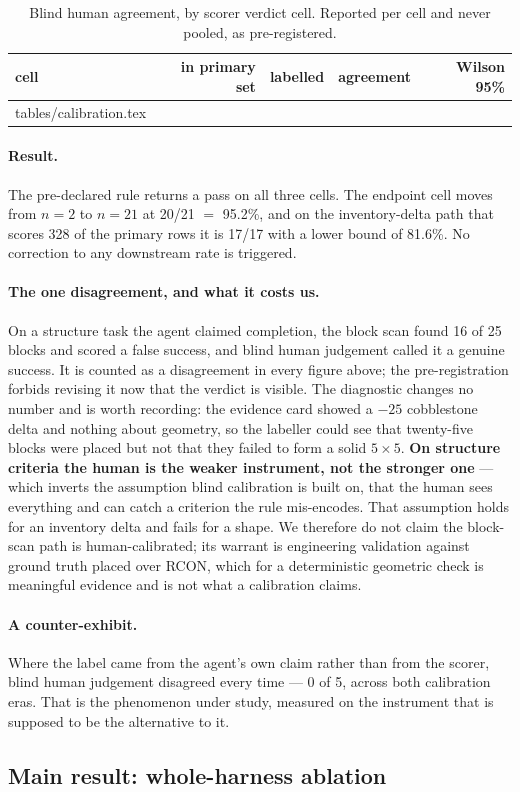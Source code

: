 \documentclass[11pt]{article}
\makeatletter
\newcommand{\inputrows}[1]{\@@input #1 }
\newcommand{\runin}[1]{\paragraph{#1}}
\makeatother
\begin{document}
\begin{table}[t]
\centering\small
\begin{tabular}{@{}lrrrr}
\toprule
cell & in primary set & labelled & agreement & Wilson 95\%\\
\midrule
\inputrows{tables/calibration.tex}
\bottomrule
\end{tabular}
\caption{Blind human agreement, by scorer verdict cell. Reported per
cell and never pooled, as pre-registered.}
\label{tab:calib}
\end{table}

\runin{Result.}
The pre-declared rule returns a pass on all three cells. The endpoint
cell moves from $n=2$ to $n=21$ at 20/21 $=$ 95.2\%, and on the
inventory-delta path that scores 328 of the \NPrimary{} primary rows it
is 17/17 with a lower bound of 81.6\%. No correction to any downstream
rate is triggered.

\runin{The one disagreement, and what it costs us.}
On a structure task the agent claimed completion, the block scan found
16 of 25 blocks and scored a false success, and blind human judgement
called it a genuine success. It is counted as a disagreement in every
figure above; the pre-registration forbids revising it now that the
verdict is visible. The diagnostic changes no number and is worth
recording: the evidence card showed a $-25$ cobblestone delta and
nothing about geometry, so the labeller could see that twenty-five
blocks were placed but not that they failed to form a solid
$5 \times 5$. \textbf{On structure criteria the human is the weaker
instrument, not the stronger one} --- which inverts the assumption blind
calibration is built on, that the human sees everything and can catch a
criterion the rule mis-encodes. That assumption holds for an inventory
delta and fails for a shape. We therefore do not claim the block-scan
path is human-calibrated; its warrant is engineering validation against
ground truth placed over RCON, which for a deterministic geometric check
is meaningful evidence and is not what a calibration claims.

\runin{A counter-exhibit.}
Where the label came from the agent's own claim rather than from the
scorer, blind human judgement disagreed every time --- 0 of 5, across
both calibration eras. That is the phenomenon under study, measured on
the instrument that is supposed to be the alternative to it.

\subsection{Main result: whole-harness ablation}
\label{sec:main}
\end{document}

